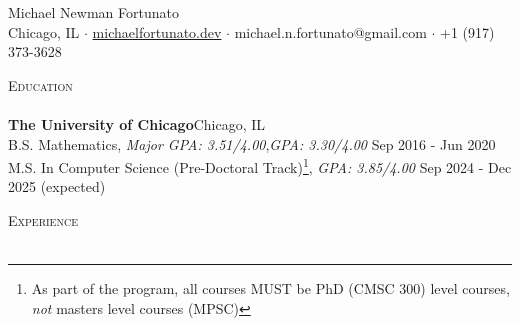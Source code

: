 \documentclass[a4paper]{article}
\newcommand{\lineunder} {
    \vspace*{-8pt} \\
    \hspace*{-18pt} \hrulefill \\
}
\newcommand{\header} [1] {
    {\hspace*{-18pt}\vspace*{6pt} \textsc{#1}}
    \vspace*{-6pt} \lineunder
}
\begin{document}
\vspace*{-40pt}



\vspace*{-10pt}
\begin{center}
	{\Huge {Michael Newman Fortunato}}\\
	Chicago, IL $\cdot$ \href{https://www.michaelfortunato.dev}{michaelfortunato.dev} $\cdot$  michael.n.fortunato@gmail.com $\cdot$ +1 (917) 373-3628 \end{center}

\header{Education}
\textbf{The University of Chicago}\hfill Chicago, IL\\
B.S. Mathematics, \textit{Major GPA: 3.51/4.00},\textit{GPA: 3.30/4.00} \hfill Sep 2016 - Jun 2020\\
M.S. In Computer Science (Pre-Doctoral Track)\footnote{As part of the program, all courses MUST be PhD (CMSC 300) level courses, \textit{not} masters level courses (MPSC)}, \textit{GPA: 3.85/4.00} \hfill Sep 2024 - Dec 2025 (expected)\\
\vspace{2mm}

\header{Experience}
\vspace{1mm}
\end{document}
